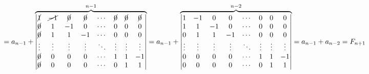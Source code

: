 \documentclass{article}
\begin{document}
\( = a_{n-1} + \overbrace{\left|\begin{matrix}\cancel{1} & \cancel{-1} & \cancel{0} & \cancel{0} & \cdots & \cancel{0} & \cancel{0} & \cancel{0} \\ \cancel{0} & 1 & -1 & 0 & \cdots & 0 & 0 & 0 \\ \cancel{0} & 1 & 1 & -1 & \cdots & 0 & 0 & 0 \\ \vdots & \vdots & \vdots & \vdots & \ddots & \vdots & \vdots & \vdots \\ \cancel{0} & 0 & 0 & 0 & \cdots & 1 & 1 & -1 \\ \cancel{0} & 0 & 0 & 0 & \cdots & 0 & 1 & 1\end{matrix}\right|}^{n-1} = a_{n-1} + \overbrace{\left|\begin{matrix}1 & -1 & 0 & 0 & \cdots & 0 & 0 & 0 \\ 1 & 1 & -1 & 0 & \cdots & 0 & 0 & 0 \\ 0 & 1 & 1 & -1 & \cdots & 0 & 0 & 0 \\ \vdots & \vdots & \vdots & \vdots & \ddots & \vdots & \vdots & \vdots \\ 0 & 0 & 0 & 0 & \cdots & 1 & 1 & -1 \\ 0 & 0 & 0 & 0 & \cdots & 0 & 1 & 1\end{matrix}\right|}^{n-2} = a_{n-1} + a_{n-2} = F_{n+1} \)
\end{document}
